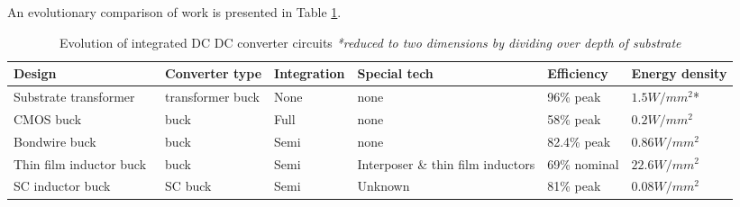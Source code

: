 \documentclass[letterpaper,twocolumn,10pt]{article}
\begin{document}
An evolutionary comparison of work is presented in Table \ref{EffnEnergyDensity}.\\
\begin{table}[t]
\centering
    \begin{tabular}{|l|l|l|l|l|l|}
    \hline
    Design                  & Converter type           & Integration & Special tech                         & Efficiency   & Energy density \\ \hline
    Substrate transformer~\cite{Gong2008}   &  transformer buck & None        & none                                 & 96\% peak    & $1.5W/mm^2$*    \\ \hline
    CMOS buck~\cite{Wens2011}               & buck                     & Full        & none                                 & 58\% peak    & $0.2W/mm^2$     \\ \hline
    Bondwire buck~\cite{ChengII2013}           & buck                     & Semi        & none                                 & 82.4\% peak  & $0.86W/mm^2$    \\ \hline
    Thin film inductor buck~\cite{Sturcken2013} & buck                     & Semi        & Interposer \& thin film inductors & 69\% nominal & $22.6W/mm^2$    \\ \hline
    SC inductor buck~\cite{Pilawa2012}        & SC buck           & Semi        & Unknown                              & 81\% peak    & $0.08W/mm^2$    \\ \hline    
    \end{tabular}
    \caption{Evolution of integrated DC DC converter circuits \textit{*reduced to two dimensions by dividing over depth of substrate}}
    \label{EffnEnergyDensity}
\end{table}
\end{document}
